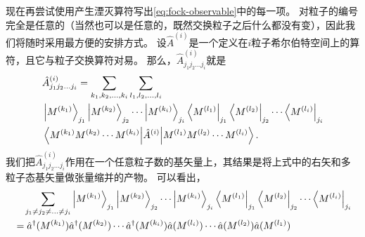 \documentclass[UTF8, a4paper]{ctexart}
\newenvironment{bigcase}{\left\{\quad\begin{aligned}}{\end{aligned}\right.}
\begin{document}
现在再尝试使用产生湮灭算符写出\eqref{eq:fock-observable}中的每一项。
对粒子的编号完全是任意的（当然也可以是任意的，既然交换粒子之后什么都没有变），因此我们将随时采用最方便的安排方式。
设$\hat{A}^{(i)}$是一个定义在$i$粒子希尔伯特空间上的算符，且它与粒子交换算符对易。
那么，$\hat{A}^{(i)}_{j_1 j_2 \ldots j_i}$就是
\[
    \begin{aligned}
        &\hat{A}^{(i)}_{j_1 j_2 \ldots j_i} 
        = \sum_{k_1, k_2, \ldots, k_i} \sum_{l_1, l_2, \ldots, l_i} \\
        &\ket{M^{(k_1)}}_{j_1} \ket{M^{(k_2)}}_{j_2} \cdots \ket{M^{(k_i)}}_{j_i} 
        \bra{M^{(l_1)}}_{j_1} \bra{M^{(l_2)}}_{j_2} \cdots \bra{M^{(l_i)}}_{j_i} \\ 
        &\mel{M^{(k_1)} M^{(k_2)} \cdots M^{(k_i)}}{\hat{A}^{(i)}}{M^{(l_1)} M^{(l_2)} \cdots M^{(l_i)}}.
    \end{aligned}
\]
我们把$\hat{A}^{(i)}_{j_1 j_2 \ldots j_i}$作用在一个任意粒子数的基矢量上，其结果是将上式中的右矢和多粒子态基矢量做张量缩并的产物。
可以看出，
\[
    \begin{aligned}
        &\quad \sum_{j_1 \neq j_2 \neq \ldots \neq j_i} \ket{M^{(k_1)}}_{j_1} \ket{M^{(k_2)}}_{j_2} \cdots \ket{M^{(k_i)}}_{j_i} 
        \bra{M^{(l_1)}}_{j_1} \bra{M^{(l_2)}}_{j_2} \cdots \bra{M^{(l_i)}}_{j_i} \\
        &= \hat{a}^\dagger (M^{(k_1)}) \hat{a}^\dagger (M^{(k_2)}) \cdots \hat{a}^\dagger (M^{(k_i)}) \hat{a} (M^{(l_i)}) \cdots \hat{a} (M^{(l_2)}) \hat{a} (M^{(l_1)})  
    \end{aligned}
\]
\end{document}
